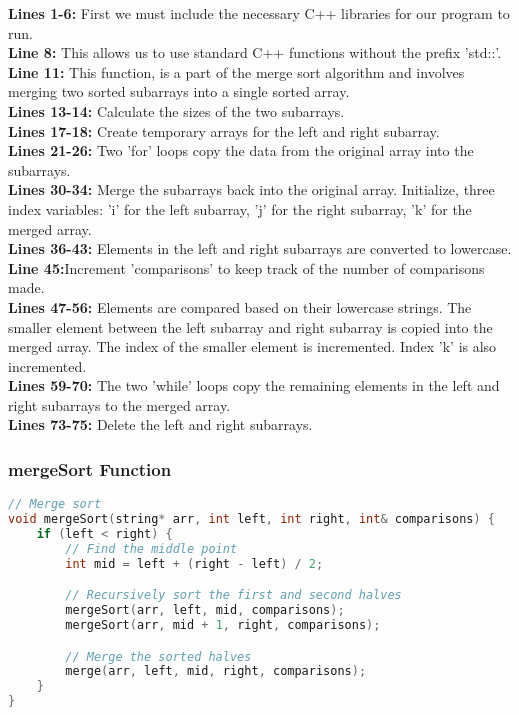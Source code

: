 \documentclass[letterpaper, 10pt,DIV=13]{scrartcl}
\numberwithin{equation}{section} %
\numberwithin{figure}{section} %
\numberwithin{table}{section} %
\begin{document}
\textbf{Lines 1-6:} First we must include the necessary C++ libraries for our program to run. \\
\textbf{Line 8:} This allows us to use standard C++ functions without the prefix 'std::'. \\
\textbf{Line 11:} This function, is a part of the merge sort algorithm and involves merging two sorted subarrays into a single sorted array. \\
\textbf{Lines 13-14:} Calculate the sizes of the two subarrays. \\
\textbf{Lines 17-18:} Create temporary arrays for the left and right subarray. \\
\textbf{Lines 21-26:} Two 'for' loops copy the data from the original array into the subarrays.  \\
\textbf{Lines 30-34:} Merge the subarrays back into the original array. Initialize, three index variables: 'i' for the left subarray, 'j' for the right subarray, 'k' for the merged array.  \\
\textbf{Lines 36-43:} Elements in the left and right subarrays are converted to lowercase. \\
\textbf{Line 45:}Increment 'comparisons' to keep track of the number of comparisons made. \\
\textbf{Lines 47-56:} Elements are compared based on their lowercase strings. The smaller element between the left subarray and right subarray is copied into the merged array. The index of the smaller element is incremented. Index 'k' is also incremented. \\
\textbf{Lines 59-70:} The two 'while' loops copy the remaining elements in the left and right subarrays to the merged array. \\
\textbf{Lines 73-75:} Delete the left and right subarrays.

\subsubsection{mergeSort Function}
\begin{linenumbers}
\begin{lstlisting}[language=C++, caption={mergeSort Function}, label={code:example}]
// Merge sort 
void mergeSort(string* arr, int left, int right, int& comparisons) {
    if (left < right) {
        // Find the middle point
        int mid = left + (right - left) / 2;

        // Recursively sort the first and second halves
        mergeSort(arr, left, mid, comparisons);
        mergeSort(arr, mid + 1, right, comparisons);

        // Merge the sorted halves
        merge(arr, left, mid, right, comparisons);
    }
}
\end{lstlisting}
\end{linenumbers}
\nolinenumbers
\end{document}
